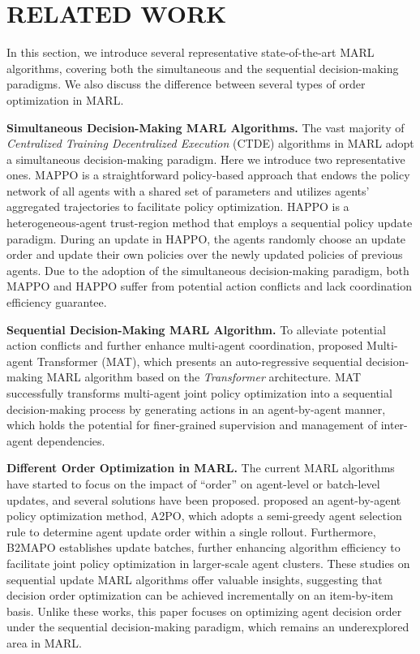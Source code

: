 \section{RELATED WORK}
\label{sec:related work}
In this section, we introduce several representative state-of-the-art MARL algorithms, covering both the simultaneous and the sequential decision-making paradigms. 
We also discuss the difference between several types of order optimization in MARL.

\noindent \textbf{Simultaneous Decision-Making MARL Algorithms.} The vast majority of \textit{Centralized Training Decentralized Execution} (CTDE) \cite{oliehoek2008optimal,foerster2018counterfactual} algorithms in MARL adopt a simultaneous decision-making paradigm. 
Here we introduce two representative ones.
MAPPO \cite{yu2022surprising} is a straightforward policy-based approach that endows the policy network of all agents with a shared set of parameters and utilizes agents' aggregated trajectories to facilitate policy optimization. 
HAPPO \cite{kuba2022trust} is a heterogeneous-agent trust-region method that employs a sequential policy update paradigm. 
During an update in HAPPO, the agents randomly choose an update order and update their own policies over the newly updated policies of previous agents. 
Due to the adoption of the simultaneous decision-making paradigm, both MAPPO and HAPPO suffer from potential action conflicts and lack coordination efficiency guarantee.

\noindent \textbf{Sequential Decision-Making MARL Algorithm.}
To alleviate potential action conflicts and further enhance multi-agent coordination, \citet{wen2022multi} proposed Multi-agent Transformer (MAT), which presents an auto-regressive sequential decision-making MARL algorithm based on the \textit{Transformer} \cite{vaswani2017attention} architecture. MAT successfully transforms multi-agent joint policy optimization into a sequential decision-making process by generating actions in an agent-by-agent manner, which holds the potential for finer-grained supervision and management of inter-agent dependencies.

\noindent \textbf{Different Order Optimization in MARL.}
The current MARL algorithms have started to focus on the impact of ``order'' on agent-level or batch-level updates, and several solutions have been proposed.
\citet{wang2023order} proposed an agent-by-agent policy optimization method, A2PO, which adopts a semi-greedy agent selection rule to determine agent update order within a single rollout. 
Furthermore, B2MAPO \cite{zhang2024b2mapo} establishes update batches, further enhancing algorithm efficiency to facilitate joint policy optimization in larger-scale agent clusters. 
These studies on sequential update MARL algorithms offer valuable insights, suggesting that decision order optimization can be achieved incrementally on an item-by-item basis.
Unlike these works, this paper focuses on optimizing agent decision order under the sequential decision-making paradigm, which remains an underexplored area in MARL.


